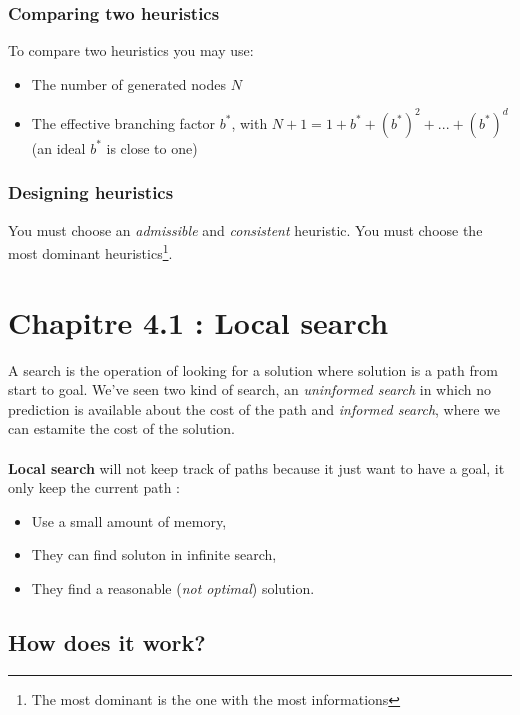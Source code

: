 \subsubsection{Comparing two heuristics}

To compare two heuristics you may use:
\begin{itemize}
\item The number of generated nodes $N$
\item The effective branching factor $b^*$, with $N+1 = 1 + b^* + (b^*)^2 + ... + (b^*)^d$ (an ideal $b^*$ is close to one)
\end{itemize}

\subsubsection{Designing heuristics}

You must choose an \textit{admissible} and \textit{consistent} heuristic. You must choose the most dominant heuristics\footnote{The most dominant is the one with the most informations}. 




\section{Chapitre 4.1 : Local search}

A search  is the operation of  looking for a solution  where solution is
a  path  from  start  to  goal.  We've  seen  two  kind  of  search,  an
\textit{uninformed search} in which no prediction is available about the
cost of the path and \textit{informed search}, where we can estamite
the cost of the solution.

\paragraph{ }
\textbf{Local search} will not keep track of paths because it just want
to have a goal, it only keep the current path :
\begin{itemize}
    \item Use a small amount of memory,
    \item They can find soluton in infinite search,
    \item They find a reasonable (\textit{not optimal}) solution.
\end{itemize}

\subsection{How does it work?}

